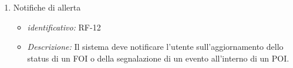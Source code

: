 \begin{enumerate}
   \item Notifiche di allerta
  \begin{itemize}
  \item\textit{identificativo:} RF-12
  \item\textit{Descrizione:} Il sistema deve notificare l’utente sull’aggiornamento dello status di un FOI o della segnalazione di un evento all’interno di un POI.
  \end{itemize}
  
\end{enumerate}
